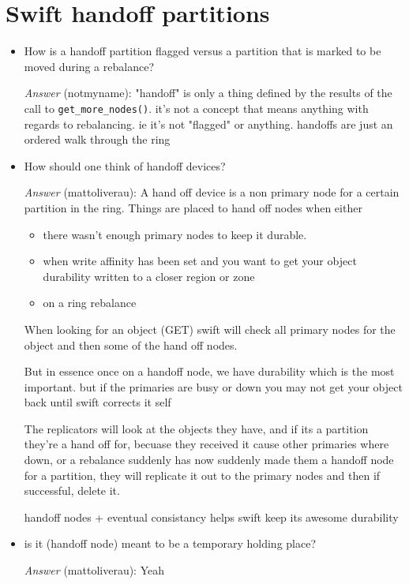 \documentclass{article}
\begin{document}
\section{Swift handoff partitions}
\label{sec:orgheadline7}
\begin{itemize}
\item How is a handoff partition flagged versus a partition that is
marked to be moved during a rebalance?

\emph{Answer} (notmyname): "handoff" is only a thing defined by the
results of the call to \texttt{get\_more\_nodes()}. it's not a concept
that means anything with regards to rebalancing. ie it's not
"flagged" or anything. handoffs are just an ordered walk through
the ring
\end{itemize}


\begin{itemize}
\item How should one think of handoff devices?

\emph{Answer} (mattoliverau): A hand off device is a non primary node
for a certain partition in the ring. Things are placed to hand
off nodes when either

\begin{itemize}
\item there wasn't enough primary nodes to keep it durable.
\item when write affinity has been set and you want to get your
object durability written to a closer region or zone
\item on a ring rebalance
\end{itemize}
When looking for an object (GET) swift will check all primary
nodes for the object and then some of the hand off nodes.

But in essence once on a handoff node, we have durability which
is the most important. but if the primaries are busy or down you
may not get your object back until swift corrects it self

The replicators will look at the objects they have, and if its a
partition they're a hand off for, becuase they received it cause
other primaries where down, or a rebalance suddenly has now
suddenly made them a handoff node for a partition, they will
replicate it out to the primary nodes and then if successful,
delete it.

handoff nodes + eventual consistancy helps swift keep its awesome
durability
\end{itemize}


\begin{itemize}
\item is it (handoff node) meant to be a temporary holding place?

\emph{Answer} (mattoliverau): Yeah
\end{itemize}
\end{document}
